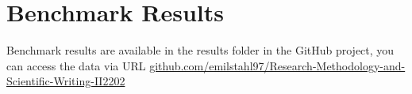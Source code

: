 \documentclass[12pt,twoside,english]{article}
\begin{document}












\clearpage



\appendix

\section{Benchmark Results}
Benchmark results are available in the results folder in the GitHub project, you can access the data via URL \href{https://github.com/emilstahl97/Research-Methodology-and-Scientific-Writing-II2202}{github.com/emilstahl97/Research-Methodology-and-Scientific-Writing-II2202}
%
%
%
%



%
%
%
%
\end{document}
